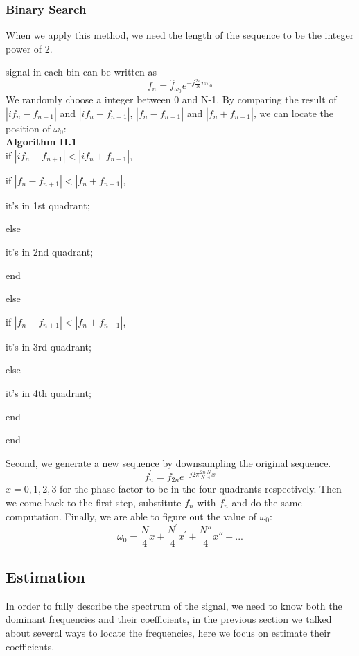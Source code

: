 \documentclass[journal,transmag]{IEEEtran}
\begin{document}
\subsubsection{Binary Search}
When we apply this method, we need the length of the sequence to be the integer power of 2.

signal in each bin can be written as
\begin{equation}
	f_n=\hat{f}_{\omega_0}e^{-j\frac{2\pi}{N}n\omega_0}
\end{equation}
We randomly choose a integer between 0 and N-1. By comparing the result of
$|if_n-f_{n+1}|$ and $|if_n+f_{n+1}|$, $|f_n-f_{n+1}|$ and $|f_n+f_{n+1}|$, we can locate the position of $\omega_0$:
\\  
\textbf{Algorithm II.1} \\
if $|if_n-f_{n+1}|<|if_n+f_{n+1}|$, 

\quad if $|f_n-f_{n+1}|<|f_n+f_{n+1}|$,

\quad \quad it's in 1st quadrant;

\quad else

\quad \quad it's in 2nd quadrant;

\quad end

else

\quad if $|f_n-f_{n+1}|<|f_n+f_{n+1}|$,

\quad \quad it's in 3rd quadrant;

\quad else

\quad \quad it's in 4th quadrant;

\quad end

end

\hrulefill

Second, we generate a new sequence by downsampling the original sequence.
\begin{equation}
	f_n^{\prime}=f_{2n}e^{-j2\pi\frac{2n}{N}\frac{N}{4}x}
\end{equation}
$x=0,1,2,3$ for the phase factor to be in the four quadrants respectively. Then we come back to the first step, substitute $f_n$ with $f_n^{\prime}$ and do the same computation. Finally, we are able to figure out the value of $\omega_0$:
\begin{equation}
	\omega_0=\frac{N}{4}x+\frac{N^{\prime}}{4}x^{\prime}+\frac{N''}{4}x''+...
\end{equation}
\subsection{Estimation}
In order to fully describe the spectrum of the signal, we need to know both the dominant frequencies and their coefficients, in the previous section we talked about several ways to locate the frequencies, here we focus on estimate their coefficients.
\end{document}
